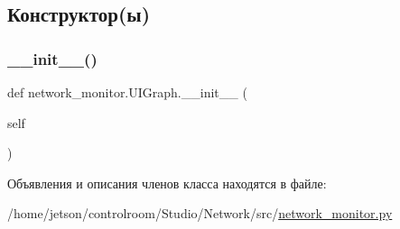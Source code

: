 \subsection{Конструктор(ы)}
\mbox{\label{classnetwork__monitor_1_1_u_i_graph_a6226e31f29149231ae294fdfa67a6fc7}} 
\subsubsection{\texorpdfstring{\+\_\+\+\_\+init\+\_\+\+\_\+()}{\_\_init\_\_()}}
{\footnotesize\ttfamily def network\+\_\+monitor.\+U\+I\+Graph.\+\_\+\+\_\+init\+\_\+\+\_\+ (\begin{DoxyParamCaption}\item[{}]{self }\end{DoxyParamCaption})}



Объявления и описания членов класса находятся в файле\+:\begin{DoxyCompactItemize}
\item 
/home/jetson/controlroom/\+Studio/\+Network/src/\hyperlink{network__monitor_8py}{network\+\_\+monitor.\+py}\end{DoxyCompactItemize}
